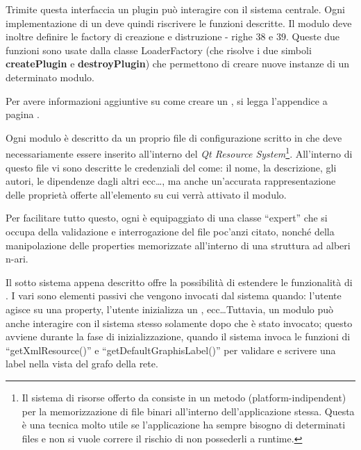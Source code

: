 Trimite questa interfaccia un plugin può interagire con il sistema centrale. Ogni implementazione di un \plugin{} deve quindi riscrivere le funzioni descritte. Il modulo deve inoltre definire le factory di creazione e distruzione - righe $38$ e $39$. Queste due funzioni sono usate dalla classe LoaderFactory (che risolve i due simboli \textbf{createPlugin} e \textbf{destroyPlugin}) che permettono di creare nuove instanze di un determinato modulo.

Per avere informazioni aggiuntive su come creare un \plugin{}, si legga l'appendice a pagina \pageref{appendice_a}.

Ogni modulo è descritto da un proprio file di configurazione scritto in \xml{} che deve necessariamente essere inserito all'interno del \emph{Qt Resource System}\footnote{Il sistema di risorse offerto da \qt{} consiste in un metodo (platform-indipendent) per la memorizzazione di file binari all'interno dell'applicazione stessa. Questa è una tecnica molto utile se l'applicazione ha sempre bisogno di determinati files e non si vuole correre il rischio di non possederli a runtime.}. All'interno di questo file vi sono descritte le credenziali del \plugin{} come: il nome, la descrizione, gli autori, le dipendenze dagli altri \plugin{} ecc\ldots, ma anche un'accurata rappresentazione delle proprietà offerte all'elemento su cui verrà attivato il modulo.

Per facilitare tutto questo, ogni \proxy{} è equipaggiato di una classe ``expert'' che si occupa della validazione e interrogazione del file \xml{} poc'anzi citato, nonché della manipolazione delle properties memorizzate all'interno di una struttura ad alberi n-ari.

Il sotto sistema appena descritto offre la possibilità di estendere le funzionalità di \visualnetkit{}. I vari \plugin{} sono elementi passivi che vengono invocati dal sistema quando: l'utente agisce su una property, l'utente inizializza un \plugin{}, ecc\ldots Tuttavia, un modulo può anche interagire con il sistema stesso solamente dopo che è stato invocato; questo avviene durante la fase di inizializzazione, quando il sistema invoca le funzioni di ``getXmlResource()'' e ``getDefaultGraphisLabel()'' per validare e scrivere una label nella vista del grafo della rete.

